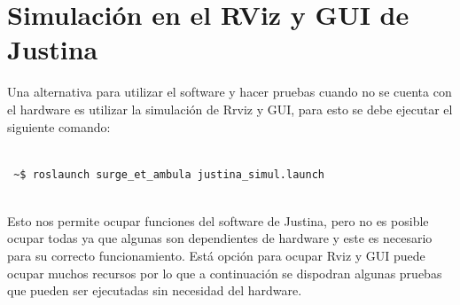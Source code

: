 \documentclass[user_manual.tex]{subfiles}
\begin{document}
\section{Simulación en el RViz y GUI de Justina}
Una alternativa para utilizar el software y hacer pruebas cuando no se cuenta con el hardware es utilizar la simulación de Rrviz y GUI, para esto se debe ejecutar el siguiente comando:\\
\\
\begin{verbatim}
 ~$ roslaunch surge_et_ambula justina_simul.launch
\end{verbatim}
\\
Esto nos permite ocupar funciones del software de Justina, pero no es posible ocupar todas ya que algunas son dependientes de hardware y este es necesario para su correcto funcionamiento. Está opción para ocupar Rviz y GUI puede ocupar muchos recursos por lo que a continuación se dispodran algunas pruebas que pueden ser ejecutadas sin necesidad del hardware.
\end{document}
